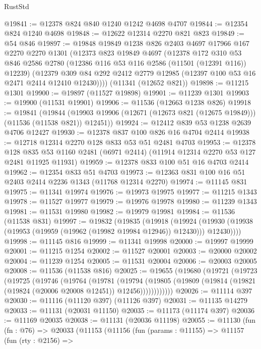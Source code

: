 \begin{lexlean}{RustStd}
\begin{coremodule}
@19841 := @12378 @824 @840 @1240 @1242 @4698 @4707
@19844 := @12354 @824 @1240 @4698
@19848 := @12622 @12314 @2270 @821 @823
@19849 := @54 @846
@19897 := @19848
    @19849
    @1238
    @826
    @2403
    @4697
    @17966
    @167
    @2270
    @2270
    @1301
    (@12373
      @823
      @19849
      @4697
      (@12378
        @172
        @310
        @53
        @846
        @2586
        @2780
        (@12386 @116 @53 @116 @2586 (@11501 (@12391 @116)) @12239)
        (@12379 @309 @84 @292 @2412 @2779 @12985 (@12397 @100 @53 @16 @2471 @2414 @12410 @12430))))
    (@11341 (@12652 @821))
@19898 := @11215 @1301
@19900 := @19897 (@11527 @19898)
@19901 := @11239 @1301
@19903 := @19900 (@11531 @19901)
@19906 := @11536 (@12663 @1238 @826)
@19918 := @19841
    (@19844 (@19903 @19906 (@12671 (@12673 @821 (@12675 @19849))) (@11536 (@11538 @821)) @12451))
@19924 := @12412 @839 @53 @1238 @2639 @4706 @12427
@19930 := @12378 @837 @100 @826 @16 @4704 @2414
@19938 := @12718 @12314 @2270 @128 @833 @53 @51 @2481 @4703
@19953 := @12378
    @128
    @835
    @53
    @1160
    @2481
    (@6971 @2414)
    (@11914 @12314 @2270 @53 @127 @2481 @11925 @11931)
@19959 := @12378 @833 @100 @51 @16 @4703 @2414
@19962 := @12354 @833 @51 @4703
@19973 := @12363 @831 @100 @16 @51 @2403 @2414 @2236 @1343 (@11768 @12314 @2270)
@19974 := @11145 @831
@19975 := @11341 @19974
@19976 := @19973 @19975
@19977 := @11215 @1343
@19978 := @11527 @19977
@19979 := @19976 @19978
@19980 := @11239 @1343
@19981 := @11531 @19980
@19982 := @19979 @19981
@19984 := @11536 (@11538 @831)
@19997 := @19832
    (@19835
      (@19918
        (@19924 (@19930 (@19938 (@19953 (@19959 (@19962 (@19982 @19984 @12946)) @12430))) @12430))))
@19998 := @11145 @816
@19999 := @11341 @19998
@20000 := @19997 @19999
@20001 := @11215 @1254
@20002 := @11527 @20001
@20003 := @20000 @20002
@20004 := @11239 @1254
@20005 := @11531 @20004
@20006 := @20003 @20005
@20008 := @11536 (@11538 @816)
@20025 := @19655
    (@19680
      (@19721
        (@19723
          (@19725
            (@19746
              (@19764
                (@19781
                  (@19794
                    (@19805
                      (@19809 (@19814 (@19821 (@19824 (@20006 @20008 @12451)) @12456))))))))))))
@20026 := @11114 @397
@20030 := @11116 (@11120 @397) (@11126 @397)
@20031 := @11135 @14279
@20033 := @11131 (@20031 @11150)
@20035 := @11173 (@11174 @397)
@20036 := @11169 @20035
@20038 := @11131 (@20036 @11198)
@20055 := @11130
    (fun (fn : @76) =>
    @20033
      (@11153
        (@11156
          (fun (params : @11155) =>
          @11157
            (fun (rty : @2156) =>

\end{coremodule}
\end{lexlean}
